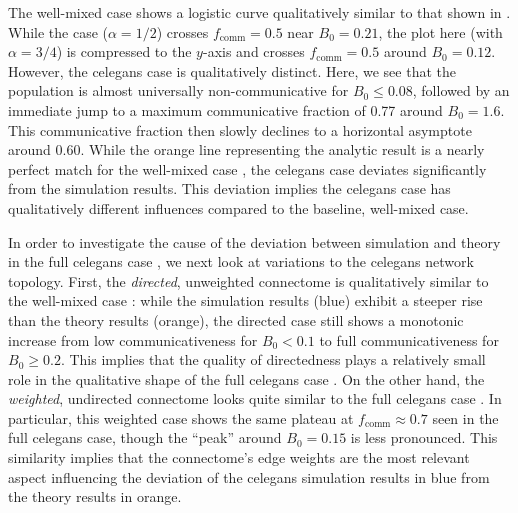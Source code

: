 \documentclass[pdflatex,lineno,referee,sn-mathphys-ay]{sn-jnl}
\begin{document}
The well-mixed case  shows a logistic curve
qualitatively similar to that shown in \citet{tripp2022evolutionary}.
While the \citet{tripp2022evolutionary} case ($\alpha = 1/2$)
crosses $f_{\text{comm}} = 0.5$ near $B_0 = 0.21$,
the plot here (with $\alpha = 3/4$) is compressed to the $y$-axis
and crosses $f_{\text{comm}} = 0.5$ around $B_0 = 0.12$.
However, the \gls{celegans} case 
is qualitatively distinct.
Here, we see that the population is almost universally non-communicative
for $B_0 \le 0.08$,
followed by an immediate jump to a maximum communicative fraction
of \num{0.77} around $B_0 = 1.6$.
This communicative fraction then slowly declines
to a horizontal asymptote around \num{0.60}.
While the orange line representing the analytic result
is a nearly perfect match for the well-mixed case ,
the \gls{celegans} case  deviates significantly
from the simulation results.
This deviation implies the \gls{celegans} case
has qualitatively different influences compared to the baseline, well-mixed case.

In order to investigate the cause of the deviation
between simulation and theory
in the full \gls{celegans} case ,
we next look at variations to the \gls{celegans} network topology.
First, the \emph{directed}, unweighted connectome
is qualitatively similar to the well-mixed case
:
while the simulation results (blue) exhibit a steeper rise
than the theory results (orange),
the directed case still shows a monotonic increase
from low communicativeness for $B_0 < 0.1$
to full communicativeness for $B_0 \ge 0.2$.
This implies that the quality of directedness
plays a relatively small role in the qualitative shape
of the full \gls{celegans} case .
On the other hand,
the \emph{weighted}, undirected connectome
looks quite similar to the full \gls{celegans} case
.
In particular, this weighted case
shows the same plateau at $f_{\text{comm}} \approx 0.7$
seen in the full \gls{celegans} case,
though the ``peak'' around $B_0 = 0.15$ is less pronounced.
This similarity implies that the connectome's edge weights
are the most relevant aspect influencing the deviation
of the \gls{celegans} 
simulation results in blue from the theory results in orange.
\end{document}
